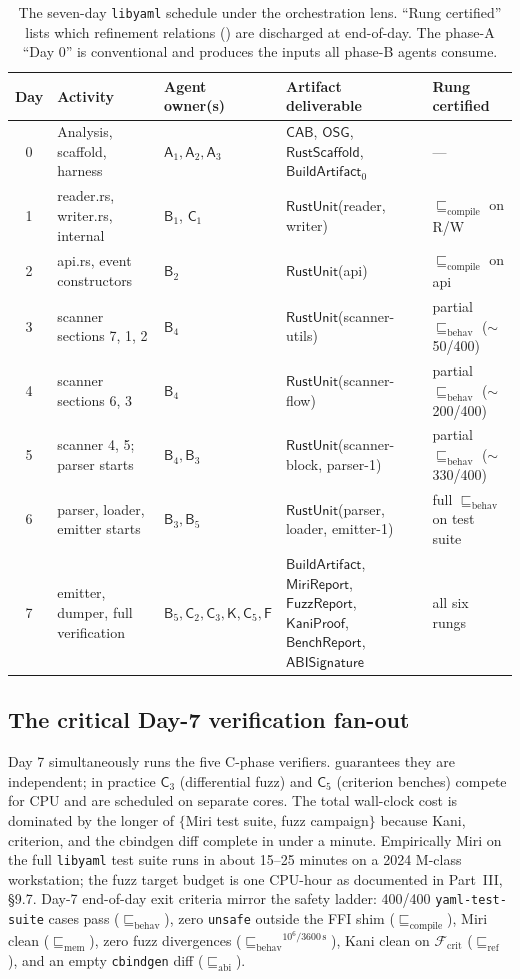 \documentclass[12pt]{article}
\theoremstyle{definition}
\theoremstyle{remark}
\newcommand{\libyaml}{\texttt{libyaml}}
\newcommand{\Agent}[1]{\ensuremath{\mathsf{#1}}}
\newcommand{\Artifact}[1]{\ensuremath{\mathsf{#1}}}
\newcommand{\Compile}{\ensuremath{\sqsubseteq_{\!\mathrm{compile}}}}
\newcommand{\Memory}{\ensuremath{\sqsubseteq_{\!\mathrm{mem}}}}
\newcommand{\Behav}{\ensuremath{\sqsubseteq_{\!\mathrm{behav}}}}
\newcommand{\Refine}{\ensuremath{\sqsubseteq_{\!\mathrm{ref}}}}
\newcommand{\ABI}{\ensuremath{\sqsubseteq_{\!\mathrm{abi}}}}
\newcommand{\CAB}{\Artifact{CAB}}
\newcommand{\OSG}{\Artifact{OSG}}
\newcommand{\Scaff}{\Artifact{RustScaffold}}
\newcommand{\RUnit}{\Artifact{RustUnit}}
\newcommand{\BArt}{\Artifact{BuildArtifact}}
\newcommand{\MiriR}{\Artifact{MiriReport}}
\newcommand{\FuzzR}{\Artifact{FuzzReport}}
\newcommand{\KaniP}{\Artifact{KaniProof}}
\newcommand{\ABISig}{\Artifact{ABISignature}}
\newcommand{\BenchR}{\Artifact{BenchReport}}
\begin{document}
\begin{table}[h]
\centering
\footnotesize
\begin{tabular}{|c|p{38mm}|p{30mm}|p{34mm}|p{30mm}|}
\hline
\textbf{Day} & \textbf{Activity} & \textbf{Agent owner(s)} & \textbf{Artifact deliverable} & \textbf{Rung certified}\\
\hline
0 & Analysis, scaffold, harness & $\Agent{A}_1, \Agent{A}_2, \Agent{A}_3$ & \CAB, \OSG, \Scaff, \BArt$_0$ & ---\\
1 & reader.rs, writer.rs, internal & $\Agent{B}_1$, $\Agent{C}_1$ & \RUnit (reader, writer) & $\Compile$ on R/W\\
2 & api.rs, event constructors & $\Agent{B}_2$ & \RUnit (api) & $\Compile$ on api\\
3 & scanner sections 7, 1, 2 & $\Agent{B}_4$ & \RUnit (scanner-utils) & partial $\Behav$ ($\sim$50/400)\\
4 & scanner sections 6, 3 & $\Agent{B}_4$ & \RUnit (scanner-flow) & partial $\Behav$ ($\sim$200/400)\\
5 & scanner 4, 5; parser starts & $\Agent{B}_4, \Agent{B}_3$ & \RUnit (scanner-block, parser-1) & partial $\Behav$ ($\sim$330/400)\\
6 & parser, loader, emitter starts & $\Agent{B}_3, \Agent{B}_5$ & \RUnit (parser, loader, emitter-1) & full $\Behav$ on test suite\\
7 & emitter, dumper, full verification & $\Agent{B}_5, \Agent{C}_2, \Agent{C}_3, \Agent{K}, \Agent{C}_5, \Agent{F}$ & \BArt, \MiriR, \FuzzR, \KaniP, \BenchR, \ABISig & all six rungs\\
\hline
\end{tabular}
\caption{The seven-day \libyaml{} schedule under the orchestration
lens. ``Rung certified'' lists which refinement relations
() are discharged at end-of-day. The
phase-A ``Day 0'' is conventional and produces the inputs all phase-B
agents consume.}
\label{tab:libyaml-schedule}
\end{table}

\subsection{The critical Day-7 verification fan-out}

Day 7 simultaneously runs the five C-phase verifiers. 
guarantees they are independent; in practice \(\Agent{C}_3\)
(differential fuzz) and \(\Agent{C}_5\) (criterion benches) compete for
CPU and are scheduled on separate cores. The total wall-clock cost is
dominated by the longer of $\{$Miri test suite, fuzz campaign$\}$
because Kani, criterion, and the cbindgen diff complete in under a
minute. Empirically Miri on the full \libyaml{} test suite runs in
about 15--25 minutes on a 2024 M-class workstation; the fuzz target
budget is one CPU-hour as documented in Part~III, \S{}9.7. Day-7
end-of-day exit criteria mirror the safety ladder: 400/400
\texttt{yaml-test-suite} cases pass ($\Behav$), zero \texttt{unsafe}
outside the FFI shim ($\Compile$), Miri clean ($\Memory$), zero fuzz
divergences ($\Behav^{10^6/3600\,\text{s}}$), Kani clean on
\(\mathcal{F}_{\mathrm{crit}}\) ($\Refine$), and an empty
\texttt{cbindgen} diff ($\ABI$).
\end{document}
